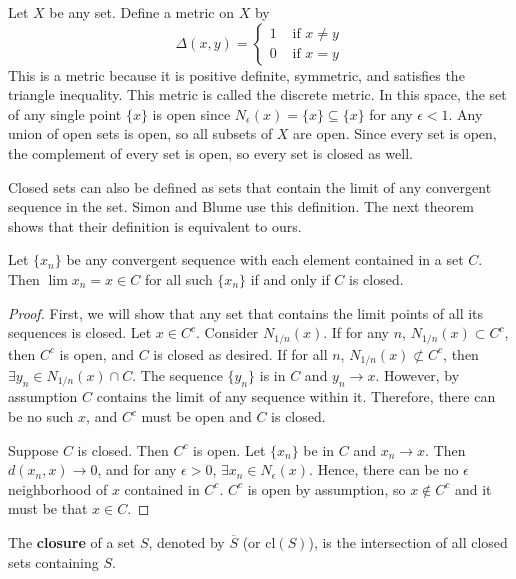 \begin{example}
  Let $X$ be any set. Define a metric on $X$ by
  \[ \Delta(x,y) = \begin{cases} 1 & \text{ if } x\neq y \\
      0 & \text{ if } x = y
    \end{cases}
  \]
  This is a metric because it is positive definite, symmetric, and
  satisfies the triangle inequality. This metric is called the
  discrete metric. In this space, the set of any single point $\{x \}$
  is open since $N_{\epsilon}(x) = \{x\} \subseteq \{x\}$ for any
  $\epsilon < 1$. Any union of open sets is open, so all subsets of
  $X$ are open. Since every set is open, the complement of every set is
  open, so every set is closed as well.  
\end{example}

Closed sets can also be defined as sets that contain the limit of any
convergent sequence in the set. Simon and Blume use this
definition. The next theorem shows that their definition is equivalent
to ours.
\begin{theorem}\label{thm:clim}
  Let $\{x_n\}$ be any convergent sequence with each element contained
  in a set $C$. Then $\lim x_n = x \in C$ for all such $\{x_n\}$ if
  and only if $C$ is closed.
\end{theorem}
\begin{proof}
  First, we will show that any set that contains the limit points of
  all its sequences is closed. Let $x \in C^c$. Consider
  $N_{1/n}(x)$. If for any $n$, $N_{1/n}(x) \subset C^c$, then $C^c$
  is open, and $C$ is closed as desired. If for all $n$, $N_{1/n}(x)
  \not \subset C^c$, then $\exists y_n \in N_{1/n}(x) \cap C$. The
  sequence $\{y_n\}$ is in $C$ and $y_n \to x$. However, by assumption
  $C$ contains the limit of any sequence within it. Therefore, there
  can be no such $x$, and $C^c$ must be open and $C$ is closed.

  Suppose $C$ is closed. Then $C^c$ is open. Let $\{x_n\}$ be in $C$
  and $x_n \to x$. Then $d(x_n, x) \to 0$, and for any $\epsilon > 0$,
  $\exists x_n \in N_\epsilon(x)$. Hence, there can be no $\epsilon$
  neighborhood of $x$ contained in $C^c$. $C^c$ is open by assumption,
  so $x \not\in C^c$ and it must be that $x \in C$. 
\end{proof}

\begin{definition}
  The \textbf{closure} of a set $S$, denoted by $\overline{S}$ (or
  $\mathrm{cl}(S)$), is the intersection of all closed sets containing $S$.
\end{definition}

